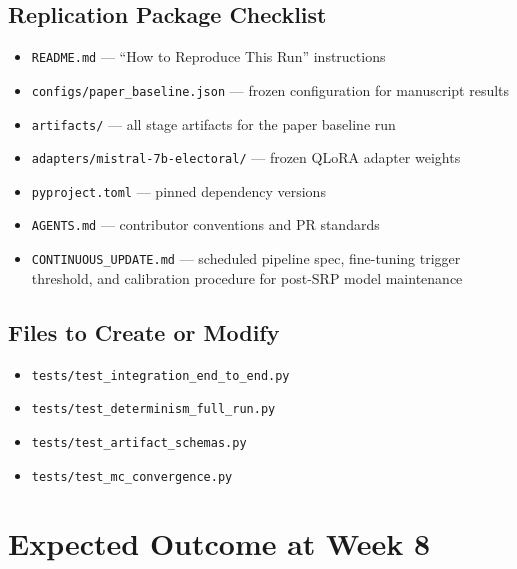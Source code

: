 \documentclass[11pt]{article}
\begin{document}
\subsection*{Replication Package Checklist}

\begin{itemize}[leftmargin=1.6em, itemsep=2pt]
  \item \texttt{README.md} --- ``How to Reproduce This Run'' instructions
  \item \texttt{configs/paper\_baseline.json} --- frozen configuration for manuscript results
  \item \texttt{artifacts/} --- all stage artifacts for the paper baseline run
  \item \texttt{adapters/mistral-7b-electoral/} --- frozen QLoRA adapter weights
  \item \texttt{pyproject.toml} --- pinned dependency versions
  \item \texttt{AGENTS.md} --- contributor conventions and PR standards
  \item \texttt{CONTINUOUS\_UPDATE.md} --- scheduled pipeline spec, fine-tuning
        trigger threshold, and calibration procedure for post-SRP model maintenance
\end{itemize}

\subsection*{Files to Create or Modify}

\begin{itemize}[leftmargin=1.6em, itemsep=2pt]
  \item \texttt{tests/test\_integration\_end\_to\_end.py}
  \item \texttt{tests/test\_determinism\_full\_run.py}
  \item \texttt{tests/test\_artifact\_schemas.py}
  \item \texttt{tests/test\_mc\_convergence.py}
\end{itemize}

\section{Expected Outcome at Week 8}
\end{document}
